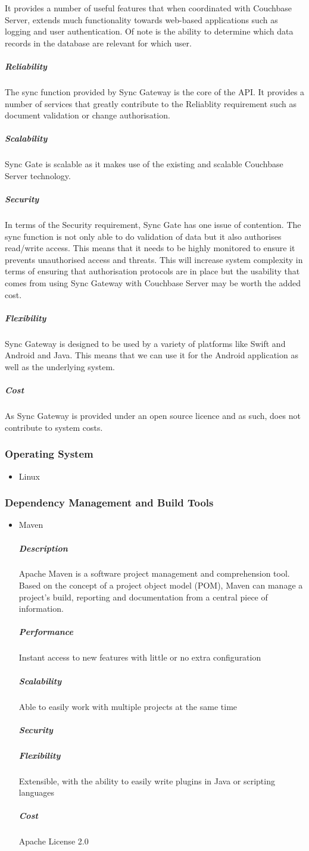 \documentclass[a4paper,10pt]{article}
\begin{document}
\begin{itemize}
			It provides a number of useful features that when coordinated with Couchbase Server, extends much functionality towards web-based applications such as logging and user authentication. Of note is the ability to determine which data records in the database are relevant for which user.
			\subparagraph{Reliability}
			The sync function provided by Sync Gateway is the core of the API. It provides a number of services that greatly contribute to the Reliablity requirement such as document validation or change authorisation.		\subparagraph{Scalability}
			Sync Gate is scalable as it makes use of the existing and scalable Couchbase Server technology.
			\subparagraph{Security}
			In terms of the Security requirement, Sync Gate has one issue of contention. The sync function is not only able to do validation of data but it also authorises read/write access. This means that it needs to be highly monitored to ensure it prevents unauthorised access and threats. This will increase system complexity in terms of ensuring that authorisation protocols are in place but the usability that comes from using Sync Gateway with Couchbase Server may be worth the added cost.
			\subparagraph{Flexibility}
			Sync Gateway is designed to be used by a variety of platforms like Swift and Android and Java. This means that we can use it for the Android application as well as the underlying system.
			\subparagraph{Cost}
			As Sync Gateway is provided under an  open source licence and as such, does not contribute to system costs.

	\end{itemize}

\subsubsection{Operating System}
	\begin{itemize}
		\item Linux
	\end{itemize}

\subsubsection{Dependency Management and Build Tools}
	\begin{itemize}
		\item Maven
			\subparagraph{Description}
				Apache Maven is a software project management and comprehension tool. Based on the concept of a project object model (POM), Maven can manage a project's build, reporting and documentation from a central piece of information. 
			\subparagraph{Performance}
				Instant access to new features with little or no extra configuration
			
			\subparagraph{Scalability}
				Able to easily work with multiple projects at the same time
			
			\subparagraph{Security}
			
			\subparagraph{Flexibility}
				Extensible, with the ability to easily write plugins in Java or scripting languages
			
			\subparagraph{Cost}
				Apache License 2.0
	\end{itemize}
\end{document}
